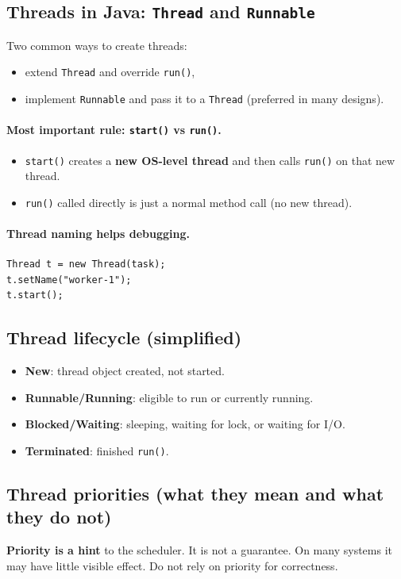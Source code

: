 \documentclass[11pt]{article}
\begin{document}
\subsection{Threads in Java: \texttt{Thread} and \texttt{Runnable}}
Two common ways to create threads:
\begin{itemize}
  \item extend \texttt{Thread} and override \texttt{run()},
  \item implement \texttt{Runnable} and pass it to a \texttt{Thread} (preferred in many designs).
\end{itemize}

\paragraph{Most important rule: \texttt{start()} vs \texttt{run()}.}
\begin{itemize}
  \item \texttt{start()} creates a \textbf{new OS-level thread} and then calls \texttt{run()} on that new thread.
  \item \texttt{run()} called directly is just a normal method call (no new thread).
\end{itemize}

\paragraph{Thread naming helps debugging.}
\begin{lstlisting}
Thread t = new Thread(task);
t.setName("worker-1");
t.start();
\end{lstlisting}

\subsection{Thread lifecycle (simplified)}
\begin{itemize}
  \item \textbf{New}: thread object created, not started.
  \item \textbf{Runnable/Running}: eligible to run or currently running.
  \item \textbf{Blocked/Waiting}: sleeping, waiting for lock, or waiting for I/O.
  \item \textbf{Terminated}: finished \texttt{run()}.
\end{itemize}

\subsection{Thread priorities (what they mean and what they do not)}
\textbf{Priority is a hint} to the scheduler. It is not a guarantee.
On many systems it may have little visible effect.
Do not rely on priority for correctness.
\end{document}
